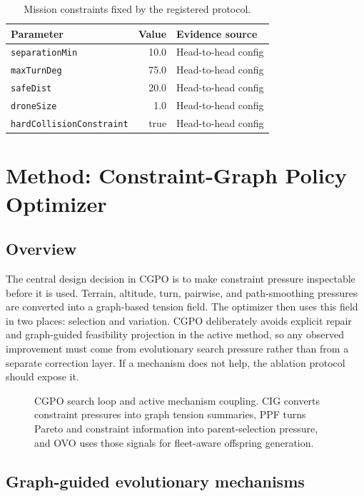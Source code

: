 \documentclass[a4paper,fleqn]{cas-dc}
\begin{document}
\begin{table}[t]
\centering
\small
\caption{Mission constraints fixed by the registered protocol.}
\label{tab:constraints}
\begin{tabular}{lrl}
\toprule
Parameter & Value & Evidence source \\
\midrule
\texttt{separationMin} & 10.0 & Head-to-head config \\
\texttt{maxTurnDeg} & 75.0 & Head-to-head config \\
\texttt{safeDist} & 20.0 & Head-to-head config \\
\texttt{droneSize} & 1.0 & Head-to-head config \\
\texttt{hardCollisionConstraint} & true & Head-to-head config \\
\bottomrule
\end{tabular}
\end{table}

\section{Method: Constraint-Graph Policy Optimizer}
\label{sec:method}

\subsection{Overview}

The central design decision in CGPO is to make constraint pressure inspectable before it is used. Terrain, altitude, turn, pairwise, and path-smoothing pressures are converted into a graph-based tension field. The optimizer then uses this field in two places: selection and variation. CGPO deliberately avoids explicit repair and graph-guided feasibility projection in the active method, so any observed improvement must come from evolutionary search pressure rather than from a separate correction layer. If a mechanism does not help, the ablation protocol should expose it.

\begin{figure}[t]
\centering
\resizebox{\textwidth}{!}{}
\caption{CGPO search loop and active mechanism coupling. CIG converts constraint pressures into graph tension summaries, PPF turns Pareto and constraint information into parent-selection pressure, and OVO uses those signals for fleet-aware offspring generation.}
\label{fig:cgpo-method-tikz}
\end{figure}

\subsection{Graph-guided evolutionary mechanisms}
\end{document}
